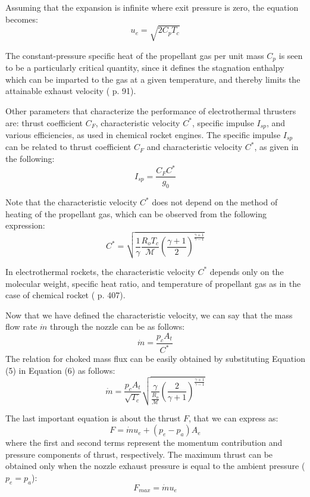 Assuming that the expansion is infinite where exit pressure is zero, the equation becomes:
\begin{equation}
    u_e = \sqrt{2 C_p T_c}
\end{equation}

The constant-pressure specific heat of the propellant gas per unit mass $C_p$ is seen to be a particularly critical quantity, since it defines the stagnation enthalpy which can be imparted to the gas at a given temperature, and thereby limits the attainable exhaust velocity (\cite{pep_book} p. 91).

Other parameters that characterize the performance of electrothermal thrusters are: thrust coefficient $C_F$, characteristic velocity $C^*$, specific impulse $I_{sp}$, and various efficiencies, as used in chemical rocket engines. The specific impulse $I_{sp}$ can be related to thrust coefficient $C_F$ and characteristic velocity $C^*$, as given in the following:
\begin{equation}
    I_{sp} = \frac{C_F C^*}{g_0}
\end{equation}

Note that the characteristic velocity $C^*$ does not depend on the method of heating of the propellant gas, which can be observed from the following expression:
\begin{equation}
    C^* = \sqrt{ \frac{1}{\gamma}{\frac{R_o T_c}{\mathcal{M}}}{\left( \frac{\gamma+1}{2} \right)^{\frac{\gamma+1}{\gamma-1}}} }
\end{equation}

In electrothermal rockets, the characteristic velocity $C^*$ depends only on the molecular weight, specific heat ratio, and temperature of propellant gas as in the case of chemical rocket (\cite{fund_rocket_prop} p. 407). 

Now that we have defined the characteristic velocity, we can say that the mass flow rate $\dot{m}$ through the nozzle can be as follows:
\begin{equation}
    \dot{m} = \frac{p_c A_t}{C^*}
\end{equation}
The relation for choked mass flux can be easily obtained by substituting Equation (5) in Equation (6) as follows:
\begin{equation}
    \dot{m} = \frac{p_c A_t}{\sqrt{T_c}}\sqrt{\frac{\gamma}{\frac{R_o}{\mathcal{M}}}\left(\frac{2}{\gamma+1}\right)^{\frac{\gamma+1}{\gamma-1}}}
\end{equation}

The last important equation is about the thrust $F$, that we can express as:
\begin{equation}
    F = \dot{m} u_e + (p_e - p_a) A_e
\end{equation}
where the first and second terms represent the momentum contribution and pressure components of thrust, respectively. The maximum thrust can be obtained only when the nozzle exhaust pressure is equal to the ambient pressure ($p_e = p_a$):
\begin{equation}
    F_{max} = \dot{m} u_e
\end{equation}

